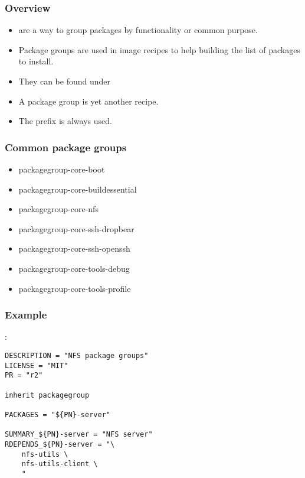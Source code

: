 \begin{frame}
  \frametitle{Overview}
  \begin{itemize}
    \item {} are a way to group packages by
      functionality or common purpose.
    \item Package groups are used in image recipes to help building
      the list of packages to install.
    \item They can be found under
    \item A package group is yet another recipe.
    \item The prefix  is always used.
  \end{itemize}
\end{frame}

\begin{frame}
  \frametitle{Common package groups}
  \begin{itemize}
    \item packagegroup-core-boot
    \item packagegroup-core-buildessential
    \item packagegroup-core-nfs
    \item packagegroup-core-ssh-dropbear
    \item packagegroup-core-ssh-openssh
    \item packagegroup-core-tools-debug
    \item packagegroup-core-tools-profile
  \end{itemize}
\end{frame}

\begin{frame}[fragile]
  \frametitle{Example}
  :
  \begin{block}{}
    \begin{verbatim}
DESCRIPTION = "NFS package groups"
LICENSE = "MIT"
PR = "r2"

inherit packagegroup

PACKAGES = "${PN}-server"

SUMMARY_${PN}-server = "NFS server"
RDEPENDS_${PN}-server = "\
    nfs-utils \
    nfs-utils-client \
    "
    \end{verbatim}
  \end{block}
\end{frame}

